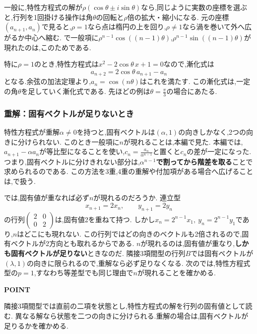 一般に,特性方程式の解が$\rho(\cos\theta\pm i\sin\theta)$なら,同じように実数の座標を選ぶと,行列を1回掛ける操作は角$\theta$の回転と$\rho$倍の拡大・縮小になる.
元の座標$(a_{n+1},a_n)$で見ると,$\rho=1$なら点は楕円の上を回り,$\rho\ne1$なら渦を巻いて外へ広がるか中心へ縮む.
で一般項に$\rho^{n-1}\cos((n-1)\theta)$,$\rho^{n-1}\sin((n-1)\theta)$が現れたのは,このためである.

特に$\rho=1$のとき,特性方程式は$x^2-2\cos\theta\,x+1=0$なので,漸化式は
\[
  a_{n+2}=2\cos\theta\,a_{n+1}-a_n
\]
となる.余弦の加法定理より,$a_n=\cos(n\theta)$はこれを満たす.
この漸化式は,一定の角$\theta$を足していく漸化式である.
先ほどの例は$\theta=\frac{\pi}{3}$の場合にあたる.

\subsubsection{重解：固有ベクトルが足りないとき}\label{節：重解：固有ベクトルが足りないとき}
特性方程式が重解$\alpha\ne0$を持つと,固有ベクトルは$(\alpha,1)$の向きしかなく,2つの向きに分けられない.
このとき一般項に$n$が現れることは,本編で見た.
本編では,$a_{n+1}-\alpha a_n$が等比型になることを使い,$c_n=\frac{a_n}{\alpha^{n-1}}$と置くと$c_n$の差が一定になった.
つまり,固有ベクトルに分けきれない部分は,\textbf{$\alpha^{n-1}$で割ってから階差を取る}ことで求められるのである.
この方法を3重,4重の重解や付加項がある場合へ広げることは,で扱う.

では,固有値が重なれば必ず$n$が現れるのだろうか.
連立型
\[
  x_{n+1}=2x_n,\qquad y_{n+1}=2y_n
\]
の行列$\begin{pmatrix}2&0\\0&2\end{pmatrix}$は,固有値2を重ねて持つ.
しかし$x_n=2^{n-1}x_1,\ y_n=2^{n-1}y_1$であり,$n$はどこにも現れない.
この行列ではどの向きのベクトルも2倍されるので,固有ベクトルが2方向とも取れるからである.
$n$が現れるのは,固有値が重なり,\textbf{しかも固有ベクトルが足りない}ときなのだ.
隣接3項間型の行列$B$では固有ベクトルが$(\lambda,1)$の向きに限られるので,重解なら必ず足りなくなる.
次のでは,特性方程式型の$p=1$,すなわち等差型でも同じ理由で$n$が現れることを確かめる.

\begin{bookpoint}
  \textbf{POINT}\par
  隣接3項間型では直前の二項を状態とし,特性方程式の解を行列の固有値として読む.
  異なる解なら状態を二つの向きに分けられる.重解の場合は,固有ベクトルが足りるかを確かめる.
\end{bookpoint}


